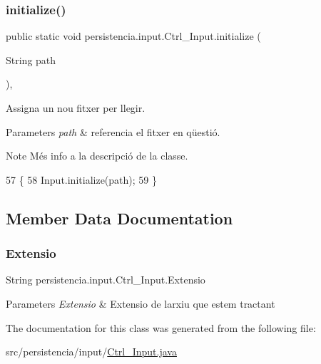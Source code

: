 \subsubsection{\texorpdfstring{initialize()}{initialize()}}
{\footnotesize\ttfamily public static void persistencia.\+input.\+Ctrl\+\_\+\+Input.\+initialize (\begin{DoxyParamCaption}\item[{String}]{path }\end{DoxyParamCaption})\hspace{0.3cm}{\ttfamily [inline]}, {\ttfamily [static]}}



Assigna un nou fitxer per llegir. 


\begin{DoxyParams}{Parameters}
{\em path} & referencia el fitxer en qüestió. \\
\hline
\end{DoxyParams}
\begin{DoxyNote}{Note}
Més info a la descripció de la classe. 
\end{DoxyNote}

\begin{DoxyCode}
57                                                \{
58         Input.initialize(path);
59     \}
\end{DoxyCode}


\subsection{Member Data Documentation}
\mbox{\label{classpersistencia_1_1input_1_1Ctrl__Input_a6041b56aa31f01f75d02382f98e259e5}} 
\subsubsection{\texorpdfstring{Extensio}{Extensio}}
{\footnotesize\ttfamily String persistencia.\+input.\+Ctrl\+\_\+\+Input.\+Extensio\hspace{0.3cm}{\ttfamily [package]}}


\begin{DoxyParams}{Parameters}
{\em Extensio} & Extensio de l\textquotesingle{}arxiu que estem tractant \\
\hline
\end{DoxyParams}


The documentation for this class was generated from the following file\+:\begin{DoxyCompactItemize}
\item 
src/persistencia/input/\hyperlink{Ctrl__Input_8java}{Ctrl\+\_\+\+Input.\+java}\end{DoxyCompactItemize}
